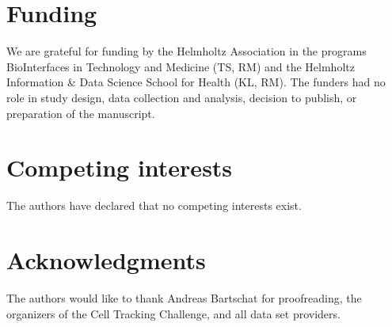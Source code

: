 \documentclass[10pt,letterpaper]{article}
\begin{document}
\section*{Funding}
We are grateful for funding by the Helmholtz Association in the programs BioInterfaces in Technology and Medicine (TS, RM) and the Helmholtz Information \& Data Science School for Health (KL, RM). The funders had no role in study design, data collection and analysis, decision to publish, or preparation of the manuscript.

\section*{Competing interests}
The authors have declared that no competing interests exist.

\section*{Acknowledgments}
The authors would like to thank Andreas Bartschat for proofreading, the organizers of the Cell Tracking Challenge, and all data set providers.
\end{document}
